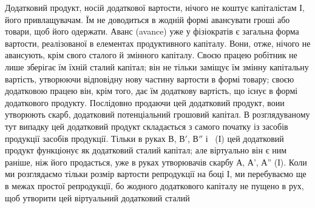 Додатковий продукт, носій додаткової вартости, нічого не коштує
капіталістам І, його привлащувачам. Їм не доводиться в жодній формі
авансувати гроші або товари, щоб його одержати. Аванс (avance)
уже у фізіократів є загальна форма вартости, реалізованої в елементах
продуктивного капіталу. Вони, отже, нічого не авансують, крім свого сталого
й змінного капіталу. Своєю працею робітник не лише зберігає їм
їхній сталий капітал; він не тільки заміщує їм змінну капітальну вартість,
утворюючи відповідну нову частину вартости в формі товару; своєю додатковою
працею він, крім того, дає їм додаткову вартість, що існує
в формі додаткового продукту. Послідовно продаючи цей додатковий
продукт, воии утворюють скарб, додатковий потенціальний грошовий капітал.
В розглядуваному тут випадку цей додатковий продукт складається
з самого початку із засобів продукції засобів продукції. Тільки в руках
$В$, $В'$, $В''$ і~ (І) цей додатковий продукт функціонує як додатковий
сталий капітал; але віртуально він є ним раніше, ніж його продасться,
уже в руках утворювачів скарбу А, А', А'' (І). Коли ми розглядаємо
тільки розмір вартости репродукції на боці І, ми перебуваємо
ще в межах простої репродукції, бо жодного додаткового капіталу
не пущено в рух, щоб утворити цей віртуальний додатковий сталий
\parbreak{}  %
